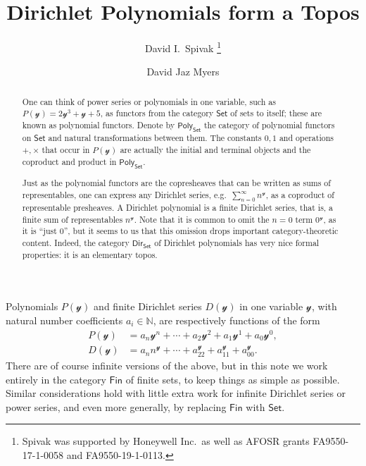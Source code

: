 \documentclass[11pt, article, one side]{memoir}
\theoremstyle{theorem}
\theoremstyle{definition}
\theoremstyle{remark}
\newcommand{\cat}[1]{\mathcal{#1}}%
\newcommand{\Cat}[1]{\mathsf{#1}}%
\newcommand{\nn}{\mathbb{N}}
\newcommand{\smset}{\Cat{Set}}
\newcommand{\finset}{\Cat{Fin}}
\newcommand{\yon}{\mathcal{y}}
\newcommand{\poly}{\Cat{Poly}}
\newcommand{\dir}{\Cat{Dir}}
\begin{document}
\title{Dirichlet Polynomials form a Topos}

\author{David I.\ Spivak%
\thanks{Spivak was supported by Honeywell Inc.\ as well as AFOSR grants FA9550-17-1-0058 and FA9550-19-1-0113.}
\and David Jaz Myers%
}

\maketitle
\begin{abstract}
One can think of power series or polynomials in one variable, such as $P(\yon)=2\yon^3+\yon+5$, as functors from the category $\smset$ of sets to itself; these are known as polynomial functors. Denote by $\poly_\smset$ the category of polynomial functors on $\smset$ and natural transformations between them. The constants $0,1$ and operations $+,\times$ that occur in $P(\yon)$ are actually the initial and terminal objects and the coproduct and product in $\poly_\smset$. 

Just as the polynomial functors are the copresheaves that can be written as sums of representables, one can express any Dirichlet series, e.g.\ $\sum_{n=0}^\infty n^\yon$, as a coproduct of representable presheaves. A Dirichlet polynomial is a finite Dirichlet series, that is, a finite sum of representables $n^{\yon}$. Note that it is common to omit the $n=0$ term $0^\yon$, as it is ``just 0'', but it seems to us that this omission drops important category-theoretic content. Indeed, the category $\dir_\smset$ of Dirichlet polynomials has very nice formal properties: it is an elementary topos.

\end{abstract}

Polynomials $P(\yon)$ and finite Dirichlet series $D(\yon)$ in one variable $\cat{y}$, with natural number coefficients $a_i\in\nn$, are respectively functions of the form
\begin{equation}\label{eqn.poly_dir_simple}
\begin{aligned}
  P(\yon)&=a_n\yon^n+\cdots+a_2\yon^2+a_1\yon^1+a_0\yon^0,\\
  D(\yon)&=a_n n^\yon+\cdots+a_22^\yon+a_11^\yon+a_00^\yon.
\end{aligned}
\end{equation}
There are of course infinite versions of the above, but in this note we work entirely in the category $\finset$ of finite sets, to keep things as simple as possible. Similar considerations hold with little extra work for infinite Dirichlet series or power series, and even more generally, by replacing $\finset$ with $\smset$. 
\end{document}
